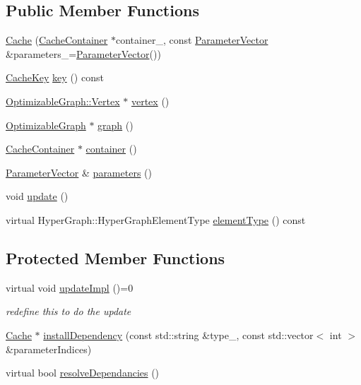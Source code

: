 \subsection*{Public Member Functions}
\begin{DoxyCompactItemize}
\item 
\mbox{\hyperlink{classg2o_1_1_cache_adb5e57e9f06505511fdedb247a977cc3}{Cache}} (\mbox{\hyperlink{classg2o_1_1_cache_container}{Cache\+Container}} $\ast$container\+\_, const \mbox{\hyperlink{namespaceg2o_a85cc8f2c7db8cab47b2b269a7acd6785}{Parameter\+Vector}} \&parameters\+\_\+=\mbox{\hyperlink{namespaceg2o_a85cc8f2c7db8cab47b2b269a7acd6785}{Parameter\+Vector}}())
\item 
\mbox{\hyperlink{classg2o_1_1_cache_1_1_cache_key}{Cache\+Key}} \mbox{\hyperlink{classg2o_1_1_cache_a2e0a0de318ff4a0f50c263869a87908b}{key}} () const
\item 
\mbox{\hyperlink{classg2o_1_1_optimizable_graph_1_1_vertex}{Optimizable\+Graph\+::\+Vertex}} $\ast$ \mbox{\hyperlink{classg2o_1_1_cache_ab94788e39d7e81201d14bc8ac58325c7}{vertex}} ()
\item 
\mbox{\hyperlink{structg2o_1_1_optimizable_graph}{Optimizable\+Graph}} $\ast$ \mbox{\hyperlink{classg2o_1_1_cache_a1a4480a445469d2d02b8db449e6cb57c}{graph}} ()
\item 
\mbox{\hyperlink{classg2o_1_1_cache_container}{Cache\+Container}} $\ast$ \mbox{\hyperlink{classg2o_1_1_cache_a249ffa5c8ac120b3123bd151200082c9}{container}} ()
\item 
\mbox{\hyperlink{namespaceg2o_a85cc8f2c7db8cab47b2b269a7acd6785}{Parameter\+Vector}} \& \mbox{\hyperlink{classg2o_1_1_cache_a16e471be92f9fe24a3abdf11a0c546d2}{parameters}} ()
\item 
void \mbox{\hyperlink{classg2o_1_1_cache_aaea446a5eb59569acc67c94793975a0b}{update}} ()
\item 
virtual Hyper\+Graph\+::\+Hyper\+Graph\+Element\+Type \mbox{\hyperlink{classg2o_1_1_cache_ace402a9e59f3fe28ae7e44854cbc5e97}{element\+Type}} () const
\end{DoxyCompactItemize}
\subsection*{Protected Member Functions}
\begin{DoxyCompactItemize}
\item 
virtual void \mbox{\hyperlink{classg2o_1_1_cache_ae46e4a4e37c034925edd6bbfdfaa1cb2}{update\+Impl}} ()=0
\begin{DoxyCompactList}\small\item\em redefine this to do the update \end{DoxyCompactList}\item 
\mbox{\hyperlink{classg2o_1_1_cache}{Cache}} $\ast$ \mbox{\hyperlink{classg2o_1_1_cache_a776574fb98726ff61bc1280ea624c6e5}{install\+Dependency}} (const std\+::string \&type\+\_\+, const std\+::vector$<$ int $>$ \&parameter\+Indices)
\item 
virtual bool \mbox{\hyperlink{classg2o_1_1_cache_a0c26f0baa33a5902002f1ca2d5f57ece}{resolve\+Dependancies}} ()
\end{DoxyCompactItemize}
